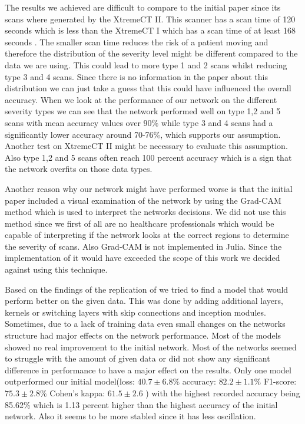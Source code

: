 \documentclass[
a4paper, 
12pt,
grayscalebody, %
abstract=on,
twoside, BCOR10mm, 12pt, DIV13,headinclude, footexclude, final, abstracton, openright
]{ibireprt}
\numberwithin{equation}{chapter}
\numberwithin{table}{chapter}
\numberwithin{figure}{chapter}
\numberwithin{algorithm}{chapter}
\numberwithin{example}{chapter}
\numberwithin{example}{chapter}
\begin{document}
The results we achieved are difficult to compare to the initial paper since its scans where generated by the XtremeCT II. This scanner has a scan time of 120 seconds which is less than the XtremeCT I which has a scan time of at least 168 seconds \cite{Tran2019}. The smaller scan time reduces the risk of a patient moving and therefore the distribution of the severity level might be different compared to the data we are using. This could lead to more type 1 and 2 scans whilst reducing type 3 and 4 scans. Since there is no information in the paper about this distribution we can just take a guess that this could have influenced the overall accuracy. When we look at the performance of our network on the different severity types we can see that the network performed well on type 1,2 and 5 scans with mean accuracy values over 90\% while type 3 and 4 scans had a significantly lower accuracy around 70-76\%, which supports our assumption. Another test on XtremeCT II might be necessary to evaluate this assumption. Also type 1,2 and 5 scans often reach 100 percent accuracy which is a sign that the network overfits on those data types. 

Another reason why our network might have performed worse is that the initial paper included a visual examination of the network by using the Grad-CAM method which is used to interpret the networks decisions. We did not use this method since we first of all are no healthcare professionals which would be capable of interpreting if the network looks at the correct regions to determine the severity of scans. Also Grad-CAM is not implemented in Julia. Since the implementation of it would have exceeded the scope of this work we decided against using this technique. 

Based on the findings of the replication of \cite{Walle2023} we tried to find a model that would perform better on the given data. This was done by adding additional layers, kernels or switching layers with skip connections and inception modules. Sometimes, due to a lack of training data even small changes on the networks structure had major effects on the network performance. Most of the models showed no real improvement to the initial network. Most of the networks seemed to struggle with the amount of given data or did not show any significant difference in performance to have a major effect on the results. Only one model outperformed our initial model(loss: $40.7\pm6.8\% $ accuracy: $82.2\pm1.1\%$ F1-score: $75.3\pm2.8\%$  Cohen's kappa: $61.5\pm2.6$ ) with the highest recorded accuracy being 85.62\% which is 1.13 percent higher than the highest accuracy of the initial network. Also it seems to be more stabled since it has less oscillation. 
\end{document}
